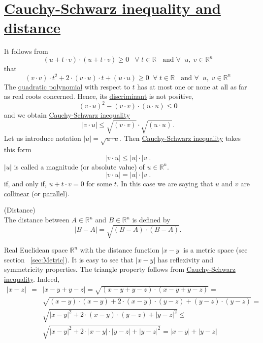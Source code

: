 \documentclass[color=black,11pt]{elegantpaper}
\begin{document}
\section{\href{https://en.wikipedia.org/wiki/Cauchy-Schwarz_inequality}{Cauchy-Schwarz inequality and distance}}
It follows from
$$
(u+t\cdot v)\cdot (u+t\cdot v)\ge 0 \;\;\;\forall\;t \in \mathbb{R}\;\;\mbox{ and } \forall\;\;u,\;v\in\mathbb{R}^n
$$
that
$$
(v \cdot v) \cdot t^2 + 2\cdot (v\cdot u) \cdot t + (u\cdot u) \ge 0 \;\;\forall\;t \in \mathbb{R}\;\;\mbox{ and } \forall\;\;u,\;v\in\mathbb{R}^n
$$
The \href{https://en.wikipedia.org/wiki/Quadratic_function}{quadratic polynomial} with respect to $t$ has at most one or none at all as far as real roots concerned.
Hence, its \href{https://en.wikipedia.org/wiki/Discriminant}{discriminant} is not positive,
$$
 (v\cdot u)^2-(v \cdot v) \cdot  (u\cdot u) \le 0
$$
and we obtain \href{https://en.wikipedia.org/wiki/Cauchy-Schwarz_inequality}{Cauchy-Schwarz inequality}
$$
|v\cdot u | \le \sqrt{(v \cdot v)}\cdot \sqrt{(u\cdot u)}.
$$
Let us introduce notation $|u|=\sqrt{u\cdot u}.$ Then \href{https://en.wikipedia.org/wiki/Cauchy-Schwarz_inequality}{Cauchy-Schwarz inequality} takes this form
$$
|v\cdot u | \le |u| \cdot |v|.
$$
$|u|$ is called  a magnitude (or absolute value) of $u\in \mathbb{R}^n.$ 
$$
|v\cdot u | = |u| \cdot |v|.
$$
if, and only if,  $u+t\cdot v = 0$ for some $t.$ In this case we are saying that $u$ and $v$ are \href{https://en.wikipedia.org/wiki/Collinearity}{collinear} (or \href{https://en.wikipedia.org/wiki/Parallel_(geometry)}{parallel}).
\begin{definition}
(Distance)\\
The distance between $A\in \mathbb{R}^n$ and  $B\in \mathbb{R}^n$ is defined by
$$
|B-A|=\sqrt{(B-A)\cdot (B-A)}.
$$
\end{definition}
Real Euclidean space $\mathbb{R}^n$ with the distance function $|x-y|$ is a metric space (see section ~\ref{sec:Metric}). It is easy to see that $|x-y|$ has reflexivity and symmetricity properties. The triangle property follows from \href{https://en.wikipedia.org/wiki/Cauchy-Schwarz_inequality}{Cauchy-Schwarz inequality}.   Indeed,
\begin{eqnarray*}
|x-z| &=& |x-y + y-z|=\sqrt{(x-y + y-z )\cdot (x-y + y-z) }=\\
&&\sqrt{(x-y)\cdot (x-y) +2\cdot (x-y)\cdot ( y-z) +( y-z)\cdot ( y-z) } =\\
&&\sqrt{|x-y|^2 +2\cdot (x-y)\cdot ( y-z) +| y-z|^2}\le\\
&& \sqrt{|x-y|^2+ 2\cdot |x-y|\cdot | y-z|+| y-z|^2 }=|x-y| + | y-z|
\end{eqnarray*}
\end{document}
